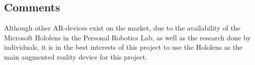 \subsection{Comments}
Although other AR-devices exist on the market, due to the availability of the Microsoft Hololens in the Personal Robotics Lab, as well as the research done by individuals, it is in the best interests of this project to use the Hololens as the main augmented reality device for this project.
